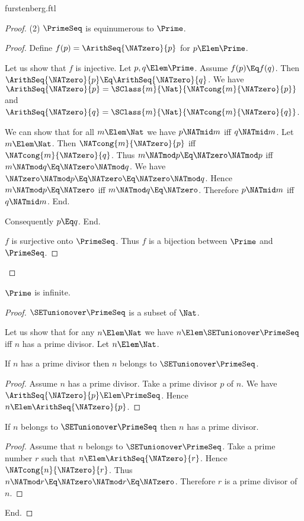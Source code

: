 \documentclass{stex}
\begin{document}
\begin{smodule}{furstenberg.ftl}
\begin{forthel}
\begin{proof}
    (2) $\PrimeSeq$ is equinumerous to $\Prime$.
    \begin{proof}
      Define $f(p) = \ArithSeq{\NATzero}{p}$ for $p \Elem \Prime$.

      Let us show that $f$ is injective.
        Let $p, q \Elem \Prime$.
        Assume $f(p) \Eq f(q)$.
        Then $\ArithSeq{\NATzero}{p} \Eq \ArithSeq{\NATzero}{q}$.
        We have $\ArithSeq{\NATzero}{p} = \SClass{m}{\Nat}{\NATcong{m}{\NATzero}{p}}$ and
        $\ArithSeq{\NATzero}{q} = \SClass{m}{\Nat}{\NATcong{m}{\NATzero}{q}}$.

        We can show that for all $m \Elem \Nat$ we have $p \NATmid m$ iff $q \NATmid m$.
          Let $m \Elem \Nat$.
          Then $\NATcong{m}{\NATzero}{p}$ iff $\NATcong{m}{\NATzero}{q}$.
          Thus $m \NATmod p \Eq \NATzero \NATmod p$ iff $m \NATmod q \Eq \NATzero \NATmod q$.
          We have $\NATzero \NATmod p \Eq \NATzero \Eq \NATzero \NATmod q$.
          Hence $m \NATmod p \Eq \NATzero$ iff $m \NATmod q \Eq \NATzero$.
          Therefore $p \NATmid m$ iff $q \NATmid m$.
        End.

        Consequently $p \Eq q$.
      End.

      $f$ is surjective onto $\PrimeSeq$.
      Thus $f$ is a bijection between $\Prime$ and $\PrimeSeq$.
    \end{proof}
  \end{proof}

  \begin{theorem}[title=Furstenberg,name=Furstenberg]
    $\Prime$ is infinite.
  \end{theorem}
  \begin{proof}
    $\SETunionover \PrimeSeq$ is a subset of $\Nat$.

    Let us show that for any $n \Elem \Nat$ we have $n \Elem \SETunionover \PrimeSeq$ iff $n$
    has a prime divisor.
      Let $n \Elem \Nat$.

      If $n$ has a prime divisor then $n$ belongs to $\SETunionover \PrimeSeq$.
      \begin{proof}
        Assume $n$ has a prime divisor.
        Take a prime divisor $p$ of $n$.
        We have $\ArithSeq{\NATzero}{p} \Elem \PrimeSeq$.
        Hence $n \Elem \ArithSeq{\NATzero}{p}$.
      \end{proof}

      If $n$ belongs to $\SETunionover \PrimeSeq$ then $n$ has a prime divisor.
      \begin{proof}
        Assume that $n$ belongs to $\SETunionover \PrimeSeq$.
        Take a prime number $r$ such that $n \Elem \ArithSeq{\NATzero}{r}$.
        Hence $\NATcong{n}{\NATzero}{r}$.
        Thus $n \NATmod r \Eq \NATzero \NATmod r \Eq \NATzero$.
        Therefore $r$ is a prime divisor of $n$.
      \end{proof}
    End.


\end{proof}
\end{forthel}
\end{smodule}
\end{document}
